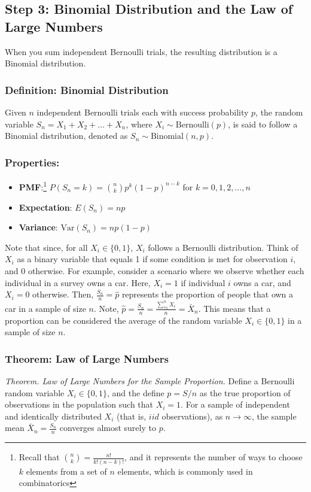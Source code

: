 \documentclass[11pt]{article}
\begin{document}
\subsection*{Step 3: Binomial Distribution and the Law of Large Numbers}

When you sum independent Bernoulli trials, the resulting distribution is a Binomial distribution.

\subsubsection*{Definition: Binomial Distribution}
Given \(n\) independent Bernoulli trials each with success probability \(p\), the random variable \(S_n = X_1 + X_2 + \ldots + X_n\), where \(X_i \sim \text{Bernoulli}(p)\), is said to follow a Binomial distribution, denoted as \(S_n \sim \text{Binomial}(n, p)\).

\subsubsection*{Properties:}
\begin{itemize}
\item  \textbf{PMF}:\footnote{Recall that $\binom{n}{k} = \frac{n!}{k! (n-k)!}$, and it represents the number of ways to choose $k$ elements from a set of $n$ elements, which is commonly used in combinatorics} \(P(S_n = k) = \binom{n}{k} p^k (1-p)^{n-k}\) for \(k = 0, 1, 2, \ldots, n\)
\item \textbf{Expectation}: \(E(S_n) = np\)
\item \textbf{Variance}: \(\text{Var}(S_n) = np(1-p)\)
\end{itemize}

Note that since, for all \( X_i \in \{0, 1\} \), \( X_i \) follows a Bernoulli distribution. Think of \( X_i \) as a binary variable that equals 1 if some condition is met for observation \( i \), and 0 otherwise. For example, consider a scenario where we observe whether each individual in a survey owns a car. Here, \( X_i = 1 \) if individual \( i \) owns a car, and \( X_i = 0 \) otherwise.  Then, $\frac{S_n}{n} = \hat{p}$ represents the proportion of people that own a car in a sample of size $n$. Note, $\hat{p} =\frac{S_n}{n}= \frac{\sum_{\forall i}^{n}{X_i}}{n} =  \bar{X}_n $. This means that a proportion can be considered the average of the random variable $X_i  \in \{0, 1\} $ in a sample of size $n$.


\subsubsection*{Theorem: Law of Large Numbers}
\emph{Theorem. Law of Large Numbers for the Sample Proportion.} Define a Bernoulli random variable \( X_i \in \{0, 1\} \), and the define \(p = S / n\) as the true proportion of observations in the population such that $X_i=1$. For a sample of independent and identically distributed $X_i$ (that is, $iid$ observations), as \(n \rightarrow \infty\), the sample mean \(\bar{X}_n = \frac{S_n}{n}\) converges almost surely to \(p\). \newline
\end{document}
